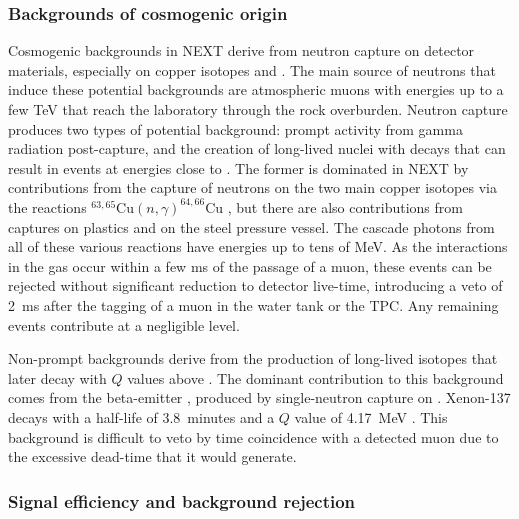 \subsubsection{Backgrounds of cosmogenic origin}
\label{sec:muons}
Cosmogenic backgrounds in NEXT derive from neutron capture on detector materials, especially on copper isotopes and . The main source of neutrons that induce these potential backgrounds are atmospheric muons with energies up to a few TeV that reach the laboratory through the rock overburden. Neutron capture produces two types of potential background: prompt activity from gamma radiation post-capture, and the creation of long-lived nuclei with decays that can result in events at energies close to \Qbb. The former is dominated in NEXT by contributions from the capture of neutrons on the two main copper isotopes via the reactions $^{63,65}\text{Cu}(n, \gamma)^{64,66}\text{Cu}$ \cite{nudat}, but there are also contributions from captures on plastics and on the steel pressure vessel. The cascade photons from all of these various reactions have energies up to tens of MeV. As the interactions in the gas occur within a few ms of the passage of a muon, these events can be rejected without significant reduction to detector live-time, introducing a veto of \SI{2}{\milli\second} after the tagging of a muon in the water tank or the TPC. Any remaining events contribute at a negligible level.

Non-prompt backgrounds derive from the production of long-lived isotopes that later decay with $Q$ values above \Qbb. The dominant contribution to this background comes from the beta-emitter , produced by single-neutron capture on . Xenon-137 decays with a half-life of \SI{3.8}{minutes} and a $Q$ value of \SI{4.17}{\mega\eV} \cite{nudat}. This background is difficult to veto by time coincidence with a detected muon due to the excessive dead-time that it would generate. 


\subsubsection{Signal efficiency and background rejection}
\label{sec:SimulationAndAnalysis}


